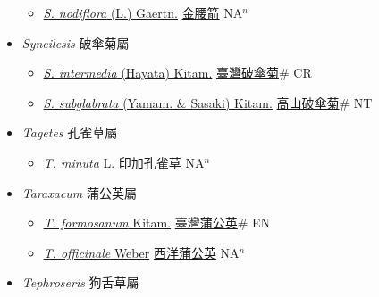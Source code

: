 \begin{itemize}
  \begin{itemize}
        \item[] \href{http://www.theplantlist.org/tpl1.1/search?q=Synedrella+nodiflora}{\textit{S. nodiflora} (L.) Gaertn.}   \href{\detokenize{http://taibnet.sinica.edu.tw/chi/taibnet_species_list.php?T2=金腰箭&T2_new_value=true&fr=y}}{金腰箭} NA$^n$
  \end{itemize}
 \item[] \textit{Syneilesis} 破傘菊屬
                    
  \begin{itemize}
        \item[] \href{http://www.theplantlist.org/tpl1.1/search?q=Syneilesis+intermedia}{\textit{S. intermedia} (Hayata) Kitam.}   \href{\detokenize{http://taibnet.sinica.edu.tw/chi/taibnet_species_list.php?T2=臺灣破傘菊&T2_new_value=true&fr=y}}{臺灣破傘菊}\# CR
        \item[] \href{http://www.theplantlist.org/tpl1.1/search?q=Syneilesis+subglabrata}{\textit{S. subglabrata} (Yamam. \& Sasaki) Kitam.}   \href{\detokenize{http://taibnet.sinica.edu.tw/chi/taibnet_species_list.php?T2=高山破傘菊&T2_new_value=true&fr=y}}{高山破傘菊}\# NT
  \end{itemize}
 \item[] \textit{Tagetes} 孔雀草屬
                    
  \begin{itemize}
        \item[] \href{http://www.theplantlist.org/tpl1.1/search?q=Tagetes+minuta}{\textit{T. minuta} L.}   \href{\detokenize{http://taibnet.sinica.edu.tw/chi/taibnet_species_list.php?T2=印加孔雀草&T2_new_value=true&fr=y}}{印加孔雀草} NA$^n$
  \end{itemize}
 \item[] \textit{Taraxacum} 蒲公英屬
                    
  \begin{itemize}
        \item[] \href{http://www.theplantlist.org/tpl1.1/search?q=Taraxacum+formosanum}{\textit{T. formosanum} Kitam.}   \href{\detokenize{http://taibnet.sinica.edu.tw/chi/taibnet_species_list.php?T2=臺灣蒲公英&T2_new_value=true&fr=y}}{臺灣蒲公英}\# EN
        \item[] \href{http://www.theplantlist.org/tpl1.1/search?q=Taraxacum+officinale}{\textit{T. officinale} Weber}   \href{\detokenize{http://taibnet.sinica.edu.tw/chi/taibnet_species_list.php?T2=西洋蒲公英&T2_new_value=true&fr=y}}{西洋蒲公英} NA$^n$
  \end{itemize}
 \item[] \textit{Tephroseris} 狗舌草屬
                    

\end{itemize}
